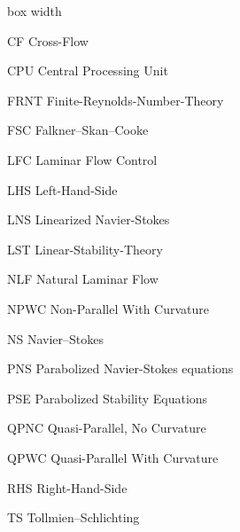 \begin{descriptionlist}{box width}

\item[{\rm CF}]   	Cross-Flow

\item[{\rm CPU}]   	Central Processing Unit

\item[{\rm FRNT}]	Finite-Reynolds-Number-Theory

\item[{\rm FSC}]	Falkner--Skan--Cooke

\item[{\rm LFC}]        Laminar Flow Control

\item[{\rm LHS}]        Left-Hand-Side

\item[{\rm LNS}]	Linearized Navier-Stokes

\item[{\rm LST}]	Linear-Stability-Theory

\item[{\rm NLF}]	Natural Laminar Flow

\item[{\rm NPWC}]	Non-Parallel With Curvature

\item[{\rm NS}]		Navier--Stokes

\item[{\rm PNS}]	Parabolized Navier-Stokes equations

\item[{\rm PSE}]	Parabolized Stability Equations

\item[{\rm QPNC}]	Quasi-Parallel, No Curvature

\item[{\rm QPWC}]	Quasi-Parallel With Curvature

\item[{\rm RHS}]     	Right-Hand-Side

\item[{\rm TS}]  	Tollmien--Schlichting

\end{descriptionlist}

